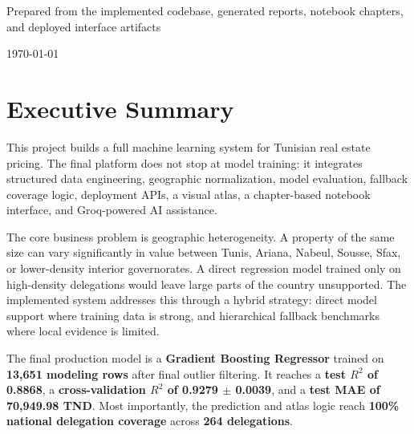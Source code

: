 \documentclass[11pt,a4paper]{article}
\newcommand{\highlight}[1]{\textcolor{BrandRedDark}{\textbf{#1}}}
\begin{document}
\begin{titlepage}
\vfill


\vspace{0.7cm}

{\large\textcolor{BrandRedDark}{Prepared from the implemented codebase, generated reports, notebook chapters, and deployed interface artifacts}}\par
\vspace{0.18cm}
{\large \today \par}
\end{titlepage}

\tableofcontents
\newpage

\section{Executive Summary}

This project builds a full machine learning system for Tunisian real estate pricing. The final platform does not stop at model training: it integrates structured data engineering, geographic normalization, model evaluation, fallback coverage logic, deployment APIs, a visual atlas, a chapter-based notebook interface, and Groq-powered AI assistance.

The core business problem is geographic heterogeneity. A property of the same size can vary significantly in value between Tunis, Ariana, Nabeul, Sousse, Sfax, or lower-density interior governorates. A direct regression model trained only on high-density delegations would leave large parts of the country unsupported. The implemented system addresses this through a hybrid strategy: direct model support where training data is strong, and hierarchical fallback benchmarks where local evidence is limited.

The final production model is a \highlight{Gradient Boosting Regressor} trained on \highlight{13,651 modeling rows} after final outlier filtering. It reaches a \highlight{test $R^2$ of 0.8868}, a \highlight{cross-validation $R^2$ of 0.9279 $\pm$ 0.0039}, and a \highlight{test MAE of 70,949.98 TND}. Most importantly, the prediction and atlas logic reach \highlight{100\% national delegation coverage} across \highlight{264 delegations}.
\end{document}
